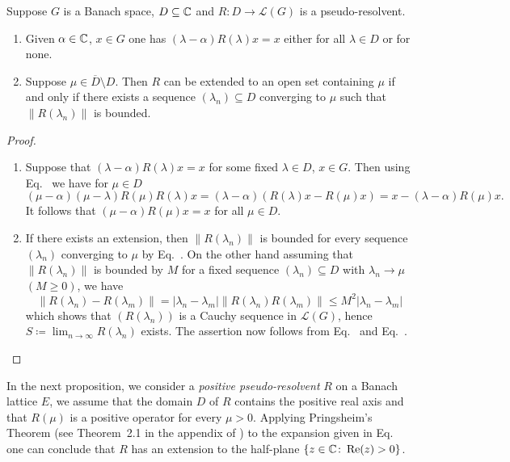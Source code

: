 \begin{proposition}\label{prop:c3-2.6}
	Suppose $G$ is a Banach space, $D \subseteq \mathbb{C} $ and $R \colon D \to \mathcal{L}(G)$ is a pseudo-resolvent.
	
	\begin{enumerate}[\upshape (i)]
		\item Given $\alpha \in \mathbb{C} $, $x \in G$ one has $(\lambda-\alpha)R(\lambda)x = x$ either for all $\lambda \in D$ or for none.
		
		\item Suppose $\mu \in \overline{D}\setminus D$. Then $R$ can be extended to an open set containing $\mu$ if and only if there exists a sequence $(\lambda_{n}) \subseteq D$ converging to $\mu$ such that $\|R(\lambda_{n})\|$ is bounded.
	\end{enumerate}
\end{proposition}
\begin{proof}
	\begin{enumerate}[\upshape (i), wide, labelindent=.25em]
		\item 
        Suppose that $(\lambda-\alpha)R(\lambda)x = x$ for some fixed $\lambda \in D$, $x \in G$.
		Then using Eq.~ we have for $\mu \in D$ 
        \[
        (\mu-\alpha)(\mu-\lambda)R(\mu)R(\lambda)x = (\lambda-\alpha)(R(\lambda)x - R(\mu)x) = x - (\lambda-\alpha)R(\mu)x .
        \]
		It follows that $(\mu-\alpha)R(\mu)x = x$ for all $\mu \in D$.
		
		\item 
        If there exists an extension, then $\|R(\lambda_{n})\|$ is bounded for every sequence $(\lambda_{n})$ converging to $\mu$ by Eq.~.
		On the other hand assuming that $\|R(\lambda_{n})\|$ is bounded by $M$ for a fixed sequence $(\lambda_{n}) \subseteq D$ with $\lambda_{n} \to \mu$ $(M \geq 0)$, we have
		\[
		\|R(\lambda_{n}) - R(\lambda_{m})\| = |\lambda_{n}-\lambda_{m}| \|R(\lambda_{n})R(\lambda_{m})\| \leq M^2|\lambda_{n}-\lambda_{m}|
        \]
        which shows that $(R(\lambda_{n}))$ is a Cauchy sequence in $\mathcal{L}(G)$, hence $S \coloneq \lim_{n\to\infty}R(\lambda_{n})$ exists.
		The assertion now follows from Eq.~ and Eq.~.
		\qedhere
	\end{enumerate}
\end{proof}
In the next proposition, we consider a \emph{positive pseudo-resolvent}
$R$ on a Banach lattice $E$, \ie  we assume that the domain $D$ of\/ $R$ contains the positive real axis and that $R(\mu)$ is a positive operator for every $\mu > 0$.
Applying Pringsheim's Theorem (see Theorem~2.1 in the appendix of \textcite{schaefer:1966}) to the expansion given in Eq.~ one can conclude that $R$ has an extension to the half-plane $\{z \in \mathbb{C}  \colon \mathop{}\!\mathrm{Re}(z) > 0\}$.

